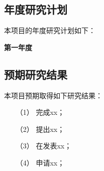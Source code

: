 \subsection{年度研究计划}
本项目的年度研究计划如下：

\textbf{第一年度}

\subsection{预期研究结果}
本项目预期取得如下研究结果：

\begin{itemize}%
\item[（1）]完成xx；

\item[（2）]提出xx；

\item[（3）]在发表xx；

\item[（4）]申请xx；
\end{itemize}
